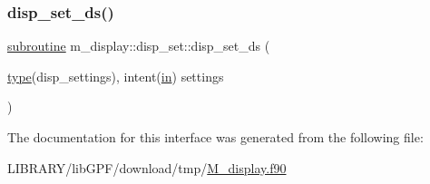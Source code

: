 \subsubsection{\texorpdfstring{disp\+\_\+set\+\_\+ds()}{disp\_set\_ds()}}
{\footnotesize\ttfamily \hyperlink{M__stopwatch_83_8txt_acfbcff50169d691ff02d4a123ed70482}{subroutine} m\+\_\+display\+::disp\+\_\+set\+::disp\+\_\+set\+\_\+ds (\begin{DoxyParamCaption}\item[{\hyperlink{stop__watch_83_8txt_a70f0ead91c32e25323c03265aa302c1c}{type}(disp\+\_\+settings), intent(\hyperlink{M__journal_83_8txt_afce72651d1eed785a2132bee863b2f38}{in})}]{settings }\end{DoxyParamCaption})\hspace{0.3cm}{\ttfamily [private]}}



The documentation for this interface was generated from the following file\+:\begin{DoxyCompactItemize}
\item 
L\+I\+B\+R\+A\+R\+Y/lib\+G\+P\+F/download/tmp/\hyperlink{M__display_8f90}{M\+\_\+display.\+f90}\end{DoxyCompactItemize}
